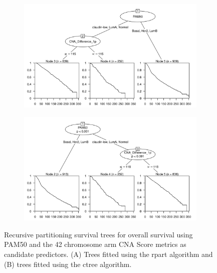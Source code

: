 \begin{figure}[!htb]
\centering

\vspace{0.5cm}

\begin{subfigure}{\textwidth}
\subcaption{}
\includegraphics[width=1\textwidth]{../figures/Appendices/Appendix_B/PA_PartyKit_Survival_Score_OS_PAM50.png}
\end{subfigure}

\vspace{2cm}

\begin{subfigure}{\textwidth}
\subcaption{}
\includegraphics[width=1\textwidth]{../figures/Appendices/Appendix_B/PA_Ctree_Survival_Score_OS_PAM50.png}
\end{subfigure}

\vspace{0.5cm}

\caption[Recursive partitioning survival trees for overall survival using PAM50 and the 42 chromosome arm CNA Score metrics as candidate predictors.]{Recursive partitioning survival trees for overall survival using PAM50 and the 42 chromosome arm CNA Score metrics as candidate predictors. (A) Trees fitted using the rpart algorithm and (B) trees fitted using the ctree algorithm.}
\end{figure}


